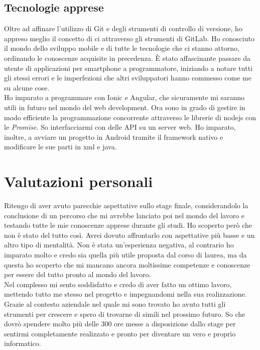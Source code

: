 \subsection{Tecnologie apprese}
Oltre ad affinare l'utilizzo di Git e degli strumenti di controllo di versione, ho appreso meglio il concetto di \gls{ci}
attraverso gli strumenti di GitLab. Ho conosciuto il mondo dello sviluppo mobile e di tutte le tecnologie che ci stanno attorno, ordinando
le conoscenze acquisite in precedenza. È stato affascinante passare da utente di applicazioni per smartphone a programmatore, iniziando a
notare tutti gli stessi errori e le imperfezioni che altri sviluppatori hanno commesso come me su alcune cose. \\
\noindent Ho imparato a programmare con Ionic e Angular, che sicuramente mi saranno utili in futuro nel mondo del web development. Ora sono
in grado di gestire in modo efficiente la programmazione concorrente attraverso le librerie di \gls{nodejs} con le \textit{Promise}. So
interfacciarmi con delle API su un server web. Ho imparato, inoltre, a avviare un progetto in Android tramite il framework nativo e
modificare le sue parti in \acrshort{xml} e \gls{java}.

\section{Valutazioni personali}
Ritengo di aver avuto parecchie aspettative sullo stage finale, considerandolo la conclusione di un percorso che mi avrebbe lanciato poi nel
mondo del lavoro e testando tutte le mie conoscenze apprese durante gli studi. Ho scoperto però che non è stato del tutto così. Avrei dovuto
affrontarlo con aspettative più basse e un altro tipo di mentalità. Non è stata un'esperienza negativa, al contrario ho imparato molto e
credo sia quella più utile proposta dal corso di laurea, ma da questa ho scoperto che mi mancano ancora moltissime competenze e conoscenze
per essere del tutto pronto al mondo del lavoro. \\
\noindent Nel complesso mi sento soddisfatto e credo di aver fatto un ottimo lavoro, mettendo tutto me stesso nel progetto e impegnandomi
nella sua realizzazione. Grazie al contesto aziendale nel quale mi sono trovato ho avuto tutti gli strumenti per crescere e spero di
trovarne di simili nel prossimo futuro. So che dovrò spendere molto più delle 300 ore messe a disposizione dallo stage per sentirmi
completamente realizzato e pronto per diventare un vero e proprio informatico.